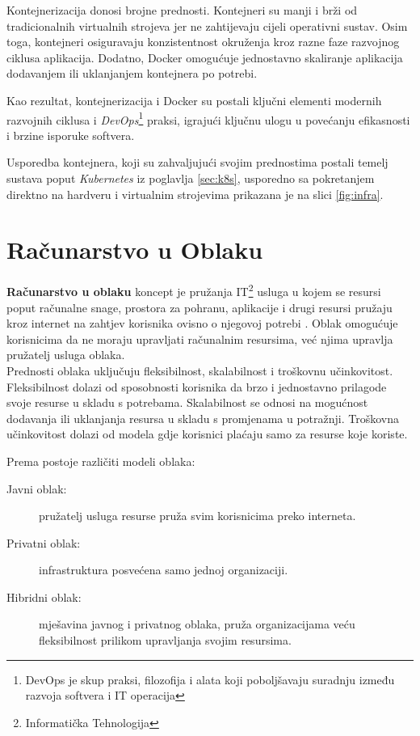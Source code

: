\documentclass[times, utf8, diplomski]{fer}
\begin{document}
Kontejnerizacija donosi brojne prednosti. Kontejneri su manji i brži od tradicionalnih virtualnih strojeva jer ne zahtijevaju cijeli operativni sustav. Osim toga, kontejneri osiguravaju konzistentnost okruženja kroz razne faze razvojnog ciklusa aplikacija. Dodatno, Docker omogućuje jednostavno skaliranje aplikacija dodavanjem ili uklanjanjem kontejnera po potrebi.

Kao rezultat, kontejnerizacija i Docker su postali ključni elementi modernih razvojnih ciklusa i \emph{DevOps}\footnote{DevOps je skup praksi, filozofija i alata koji poboljšavaju suradnju između razvoja softvera  i IT operacija } praksi, igrajući ključnu ulogu u povećanju efikasnosti i brzine isporuke softvera. 

Usporedba kontejnera, koji su zahvaljujući svojim prednostima postali temelj sustava poput \emph{Kubernetes} iz poglavlja \ref{sec:k8s}, usporedno sa pokretanjem direktno na hardveru i virtualnim strojevima prikazana je na slici \ref{fig:infra}.

\section{Računarstvo u Oblaku}

\textbf{Računarstvo u oblaku}  koncept je pružanja IT\footnote{Informatička Tehnologija } usluga u kojem se resursi poput računalne snage, prostora za pohranu, aplikacije i drugi resursi pružaju kroz internet na zahtjev korisnika ovisno o njegovoj potrebi \citep{zarko_raspodijeljeni_2013}. Oblak omogućuje korisnicima da ne moraju upravljati računalnim resursima, već njima upravlja pružatelj usluga oblaka. \\

Prednosti oblaka uključuju fleksibilnost, skalabilnost i troškovnu učinkovitost. Fleksibilnost dolazi od sposobnosti korisnika da brzo i jednostavno prilagode svoje resurse u skladu s potrebama. Skalabilnost se odnosi na mogućnost dodavanja ili uklanjanja resursa u skladu s promjenama u potražnji. Troškovna učinkovitost dolazi od modela gdje korisnici plaćaju samo za resurse koje koriste.

Prema \citet{zarko_raspodijeljeni_2013} postoje različiti modeli oblaka:
\begin{description}
	\item [Javni oblak:] pružatelj usluga resurse pruža svim korisnicima preko interneta.
	\item [Privatni oblak:] infrastruktura posvećena samo jednoj organizaciji.
	\item [Hibridni oblak:] mješavina javnog i privatnog oblaka, pruža organizacijama veću fleksibilnost prilikom upravljanja svojim resursima.
\end{description}
\end{document}

